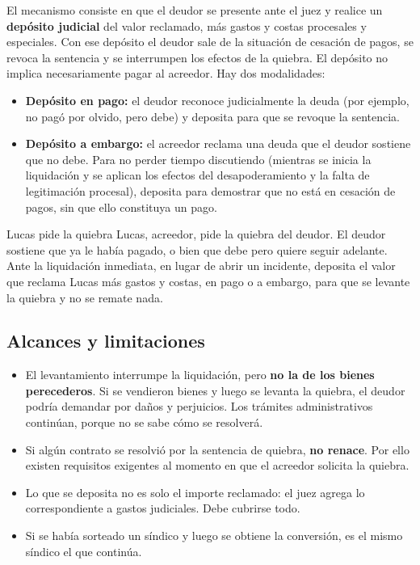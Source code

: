 \documentclass[12pt,oneside]{book}
\begin{document}
El mecanismo consiste en que el deudor se presente ante el juez y realice un \textbf{depósito judicial} del valor reclamado, más gastos y costas procesales y especiales. Con ese depósito el deudor sale de la situación de cesación de pagos, se revoca la sentencia y se interrumpen los efectos de la quiebra. El depósito no implica necesariamente pagar al acreedor. Hay dos modalidades:

\begin{itemize}
    \item \textbf{Depósito en pago:} el deudor reconoce judicialmente la deuda (por ejemplo, no pagó por olvido, pero debe) y deposita para que se revoque la sentencia.
    \item \textbf{Depósito a embargo:} el acreedor reclama una deuda que el deudor sostiene que no debe. Para no perder tiempo discutiendo (mientras se inicia la liquidación y se aplican los efectos del desapoderamiento y la falta de legitimación procesal), deposita para demostrar que no está en cesación de pagos, sin que ello constituya un pago.
\end{itemize}

\begin{example}{Lucas pide la quiebra}
Lucas, acreedor, pide la quiebra del deudor. El deudor sostiene que ya le había pagado, o bien que debe pero quiere seguir adelante. Ante la liquidación inmediata, en lugar de abrir un incidente, deposita el valor que reclama Lucas más gastos y costas, en pago o a embargo, para que se levante la quiebra y no se remate nada.
\end{example}

\subsection{Alcances y limitaciones}

\begin{itemize}
    \item El levantamiento interrumpe la liquidación, pero \textbf{no la de los bienes perecederos}. Si se vendieron bienes y luego se levanta la quiebra, el deudor podría demandar por daños y perjuicios. Los trámites administrativos continúan, porque no se sabe cómo se resolverá.
    \item Si algún contrato se resolvió por la sentencia de quiebra, \textbf{no renace}. Por ello existen requisitos exigentes al momento en que el acreedor solicita la quiebra.
    \item Lo que se deposita no es solo el importe reclamado: el juez agrega lo correspondiente a gastos judiciales. Debe cubrirse todo.
    \item Si se había sorteado un síndico y luego se obtiene la conversión, es el mismo síndico el que continúa.
\end{itemize}
\end{document}
